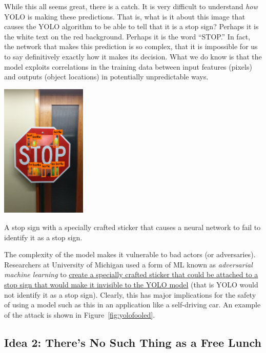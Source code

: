 \documentclass[assignment01_Solutions]{subfiles}
\begin{document}
While this all seems great, there is a catch.  It is very difficult to understand \emph{how} YOLO is making these predictions.  That is, what is it about this image that causes the YOLO algorithm to be able to tell that it is a stop sign?  Perhaps it is the white text on the red background.  Perhaps it is the word ``STOP.''  In fact, the network that makes this prediction is so complex, that it is impossible for us to say definitively exactly how it makes its decision.  What we do know is that the model exploits correlations in the training data between input features (pixels) and outputs (object locations) in potentially unpredictable ways.

\begin{marginfigure}
\includegraphics[width=1.6in]{figures/yolofooled}
\caption{A stop sign with a specially crafted sticker that causes a neural network to fail to identify it as a stop sign.}\label{fig:yolofooled}
\end{marginfigure}
The complexity of the model makes it vulnerable to bad actors (or adversaries).  Researchers at University of Michigan used a form of ML known as \emph{adversarial machine learning} to \href{https://iotsecurity.engin.umich.edu/physical-adversarial-examples-for-object-detectors/}{create a specially crafted sticker that could be attached to a stop sign that would make it invisible to the YOLO model} (that is YOLO would not identify it as a stop sign).  Clearly, this has major implications for the safety of using a model such as this in an application like a self-driving car.   An example of the attack is shown in Figure~\ref{fig:yolofooled}.


\ei

\subsection*{Idea 2: There's No Such Thing as a Free Lunch}
\end{document}
